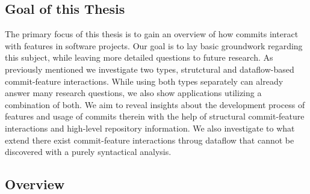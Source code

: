 



\subsection*{Goal of this Thesis}\label{sec:thesis_goal}

The primary focus of this thesis is to gain an overview of how commits interact with features in software projects. 
Our goal is to lay basic groundwork regarding this
subject, while leaving more detailed questions to future research. As previously mentioned
we investigate two types, strutctural and dataflow-based commit-feature interactions. While
using both types separately can already answer many research questions, we also show
applications utilizing a combination of both.
We aim to reveal insights about the development process of features and usage of commits therein 
with the help of structural commit-feature interactions and high-level repository information.
We also investigate to what extend there exist commit-feature interactions
throug dataflow that cannot be discovered with a purely syntactical analysis.

\subsection*{Overview}\label{sec:overview}

